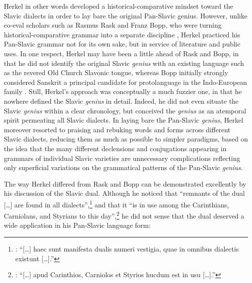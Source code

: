 Herkel in other words developed a historical-comparative mindset toward the Slavic dialects in order to lay bare the original Pan-Slavic genius. However, unlike co-eval scholars such as Rasmus Rask and Franz Bopp, who were turning historical-comparative grammar into a separate discipline \citep{swiggers_indo-european_2017}, Herkel practiced his Pan-Slavic grammar not for its own sake, but in service of literature and public uses. In one respect, Herkel may have been a little ahead of Rask and Bopp, in that he did not identify the original Slavic \textit{genius} with an existing language such as the revered Old Church Slavonic tongue, whereas Bopp initially strongly considered Sanskrit a principal candidate for protolanguage in the Indo-European family \citep[125, 155]{swiggers_lelaboration_1996}. Still, Herkel’s approach was conceptually a much fuzzier one, in that he nowhere defined the Slavic \textit{genius} in detail. Indeed, he did not even situate the Slavic \textit{genius} within a clear chronology, but conceived the \textit{genius} as an atemporal spirit permeating all Slavic dialects. In laying bare the Pan-Slavic \textit{genius}, Herkel moreover resorted to praising and rebuking words and forms across different Slavic dialects, reducing them as much as possible to simpler paradigms, based on the idea that the many different declensions and conjugations appearing in grammars of individual Slavic varieties are unnecessary complications reflecting only superficial variations on the grammatical patterns of the Pan-Slavic \textit{genius}.

The way Herkel differed from Rask and Bopp can be demonstrated excellently by his discussion of the Slavic dual. Although he noticed that “remnants of the dual […] are found in all dialects”,\footnote{\citet[36]{herkel_elementa_1826}: “[…] haec sunt manifesta dualis numeri vestigia, quae in omnibus dialectis existunt […].”} and that it “is in use among the Carinthians, Carniolans, and Styrians to this day”,\footnote{\citet[49]{herkel_elementa_1826}: “[…] apud Carinthios, Carniolos et Styrios hucdum est in usu […].”} he did not sense that the dual deserved a wide application in his Pan-Slavic language form:

